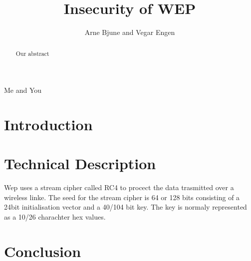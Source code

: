 \documentclass[twocolumn]{IEEEtran}
\begin{document}
\title{Insecurity of WEP}


\author{Arne Bjune and Vegar Engen}

{Me and You}

\maketitle

\begin{abstract}
Our abstract
\end{abstract}

\section {Introduction}


\section {Technical Description}
Wep uses a stream cipher called RC4 to procect the data trasmitted over a wireless linke. The seed for the stream cipher is 64 or 128 bits consisting of a 24bit initialisation vector and a 40/104 bit key. The key is normaly represented as a 10/26 charachter hex values.


\section {Conclusion}




\end{document}
